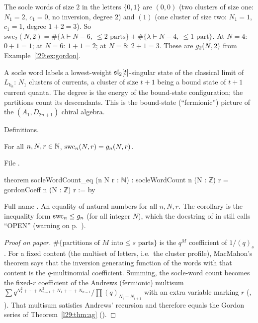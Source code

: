 \begin{example}[$n=2$, $r=2$]\label{l29:ex:socle}
The socle words of size $2$ in the letters $\{0,1\}$ are $(0,0)$ (two clusters of size one: $N_1=2$, $c_1=0$, no
inversion, degree $2$) and $(1)$ (one cluster of size two: $N_1=1$, $c_1=1$, degree $1+2=3$). So
$\mathrm{swc}_2(N,2)=\#\{\lambda\vdash N-6,\ \le2\text{ parts}\}+\#\{\lambda\vdash N-4,\ \le1\text{ part}\}$. At $N=4$:
$0+1=1$; at $N=6$: $1+1=2$; at $N=8$: $2+1=3$. These are $g_2(N,2)$ from Example~\ref{l29:ex:gordon}.
\end{example}

\begin{physics}
A socle word labels a lowest-weight $\mathfrak{sl}_2[t]$-singular state of the classical limit of $L_{k_n}$: $N_1$
clusters of currents, a cluster of size $t+1$ being a bound state of $t+1$ current quanta. The degree is the energy of
the bound-state configuration; the partitions count its descendants. This is the bound-state (``fermionic'') picture of
the $(A_1,D_{2n+1})$ chiral algebra.
\end{physics}

\begin{status}
Definitions.
\end{status}

\begin{theorem}\label{l29:thm:swc}
For all $n,N,r\in{\mathbb{N}}$, $\mathrm{swc}_n(N,r)=g_n(N,r)$.
\end{theorem}

\noindent File .
\begin{leancode}
theorem socleWordCount_eq (n N r : ℕ) :
    socleWordCount n (N : ℤ) r = gordonCoeff n (N : ℤ) r := by
\end{leancode}

\begin{dictionary}
Full name . An equality of natural numbers for all $n,N,r$. The corollary
 is the inequality form $\mathrm{swc}_n\le g_n$ (for all integer $N$), which the
docstring of  in  still calls ``OPEN''
(warning on p.~\pageref{l29:warn:stale}).
\end{dictionary}

\begin{proof}[Proof on paper]
$\#\{\text{partitions of }M\text{ into}\le s\text{ parts}\}$ is the $q^M$ coefficient of $1/(q)_s$. For a fixed
content (the multiset of letters, i.e.\ the cluster profile), MacMahon's theorem says that the inversion generating
function of the words with that content is the $q$-multinomial coefficient. Summing, the socle-word count becomes the
fixed-$r$ coefficient of the Andrews (fermionic) multisum
$\sum q^{N_1^2+\cdots+N_{n-1}^2+N_1+\cdots+N_{n-1}}/\prod(q)_{N_i-N_{i+1}}$ with an extra variable marking $r$
(, ). That multisum satisfies Andrews' recursion and therefore equals the
Gordon series of Theorem~\ref{l29:thm:ag} ().
\end{proof}

